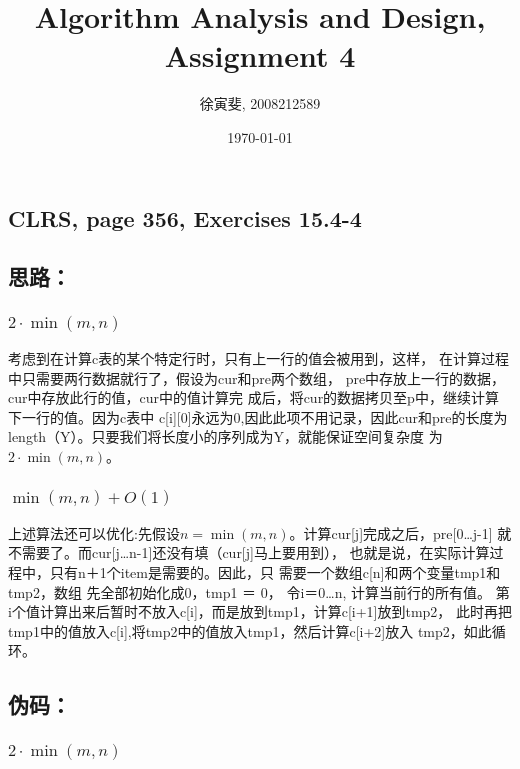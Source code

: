 \documentclass{article}
\begin{document}
\begin{CJK}{UTF8}{gbsn}
\title{Algorithm Analysis and Design, Assignment 4}
\author{徐寅斐, 2008212589}
\date{\today}
\maketitle

\section{CLRS, page 356, Exercises 15.4-4}

\subsection*{思路：}

\subsubsection*{$2\cdot\min(m,n)$}

考虑到在计算c表的某个特定行时，只有上一行的值会被用到，这样，
在计算过程中只需要两行数据就行了，假设为cur和pre两个数组，
pre中存放上一行的数据，cur中存放此行的值，cur中的值计算完
成后，将cur的数据拷贝至p中，继续计算下一行的值。因为c表中
c[i][0]永远为0,因此此项不用记录，因此cur和pre的长度为
length（Y）。只要我们将长度小的序列成为Y，就能保证空间复杂度
为$2\cdot\min(m, n)$。

\subsubsection*{$\min(m,n) + O(1)$}

上述算法还可以优化:先假设$n = \min(m,n)$。计算cur[j]完成之后，pre[0\ldots j-1]
就不需要了。而cur[j\ldots n-1]还没有填（cur[j]马上要用到），
也就是说，在实际计算过程中，只有n＋1个item是需要的。因此，只
需要一个数组c[n]和两个变量tmp1和tmp2，数组
先全部初始化成0，tmp1 ＝ 0， 令i＝0\ldots n, 计算当前行的所有值。
第i个值计算出来后暂时不放入c[i]，而是放到tmp1，计算c[i+1]放到tmp2，
此时再把tmp1中的值放入c[i],将tmp2中的值放入tmp1，然后计算c[i+2]放入
tmp2，如此循环。

\subsection*{伪码：}

\subsubsection*{$2\cdot\min(m,n)$}


\end{CJK}
\end{document}
